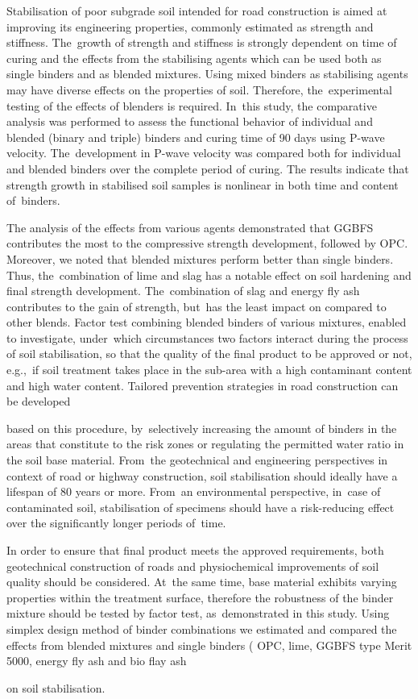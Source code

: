 \documentclass[materials,article,accept,pdftex,moreauthors]{Definitions/mdpi}
\begin{document}
Stabilisation of poor subgrade soil intended for road construction is aimed at improving its engineering properties, commonly estimated as strength and stiffness. The~growth of strength and stiffness is strongly dependent on time of curing and the effects from the stabilising agents which can be used both as single binders and as blended mixtures. Using mixed binders as stabilising agents may have diverse effects on the properties of soil. Therefore, the~experimental testing of the effects of blenders is required. In~this study, the comparative analysis was performed to assess the functional behavior of individual and blended (binary and triple) binders and curing time of 90 days using P-wave velocity. The~development in P-wave velocity was compared both for individual and blended binders over the complete period of curing. The results indicate that strength growth in stabilised soil samples is nonlinear in both time and content of~binders. 

The analysis of the effects from various agents demonstrated that GGBFS contributes the most to the compressive strength development, followed by OPC. Moreover, we noted that blended mixtures perform better than single binders. Thus, the~combination of lime and slag has a notable effect on soil hardening and final strength development. The~combination of slag and energy fly ash contributes to the gain of strength, but~has the least impact on compared to other blends. Factor test combining blended binders of various mixtures, enabled to investigate, under~which circumstances two factors interact during the process of soil stabilisation, so that the quality of the final product to be approved or not, e.g.,~if soil treatment takes place in the sub-area with a high contaminant content and high water content. Tailored prevention strategies in road construction can be developed {based on this procedure, by~selectively increasing the amount of binders in the areas that constitute to the risk zones or regulating the permitted water ratio in the soil base material. From~the geotechnical and engineering perspectives in context of road or highway construction, soil stabilisation should ideally have a lifespan of 80 years or more. From~an environmental perspective, in~case of contaminated soil, stabilisation of specimens should have a risk-reducing effect over the significantly longer periods of~time. 

In order to ensure that final product meets the approved requirements, both geotechnical construction of roads and physiochemical improvements of soil quality should be considered. At~the same time, base material exhibits varying properties within the treatment surface, therefore the robustness of the binder mixture should be tested by factor test, as~demonstrated in this study. Using simplex design method of binder combinations we estimated and compared the effects from blended mixtures and single binders (%
OPC, lime, GGBFS type Merit 5000, energy fly ash and bio flay ash} on soil stabilisation.
\end{document}
